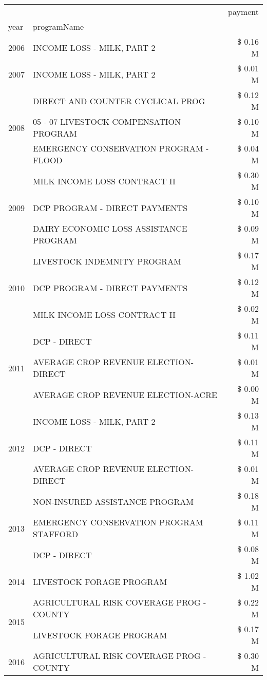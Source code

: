 \begin{tabular}{llr}
\toprule
 &  & payment \\
year & programName &  \\
\midrule
2006 & INCOME LOSS - MILK, PART 2 & \$ 0.16 M \\
\cline{1-3}
2007 & INCOME LOSS - MILK, PART 2 & \$ 0.01 M \\
\cline{1-3}
\multirow[t]{3}{*}{2008} & DIRECT AND COUNTER CYCLICAL PROG & \$ 0.12 M \\
 & 05 - 07 LIVESTOCK COMPENSATION PROGRAM & \$ 0.10 M \\
 & EMERGENCY CONSERVATION PROGRAM - FLOOD & \$ 0.04 M \\
\cline{1-3}
\multirow[t]{3}{*}{2009} & MILK INCOME LOSS CONTRACT II & \$ 0.30 M \\
 & DCP PROGRAM - DIRECT PAYMENTS & \$ 0.10 M \\
 & DAIRY ECONOMIC LOSS ASSISTANCE PROGRAM & \$ 0.09 M \\
\cline{1-3}
\multirow[t]{3}{*}{2010} & LIVESTOCK INDEMNITY PROGRAM & \$ 0.17 M \\
 & DCP PROGRAM - DIRECT PAYMENTS & \$ 0.12 M \\
 & MILK INCOME LOSS CONTRACT II & \$ 0.02 M \\
\cline{1-3}
\multirow[t]{3}{*}{2011} & DCP - DIRECT & \$ 0.11 M \\
 & AVERAGE CROP REVENUE ELECTION-DIRECT & \$ 0.01 M \\
 & AVERAGE CROP REVENUE ELECTION-ACRE & \$ 0.00 M \\
\cline{1-3}
\multirow[t]{3}{*}{2012} & INCOME LOSS - MILK, PART 2 & \$ 0.13 M \\
 & DCP - DIRECT & \$ 0.11 M \\
 & AVERAGE CROP REVENUE ELECTION-DIRECT & \$ 0.01 M \\
\cline{1-3}
\multirow[t]{3}{*}{2013} & NON-INSURED ASSISTANCE PROGRAM & \$ 0.18 M \\
 & EMERGENCY CONSERVATION PROGRAM STAFFORD & \$ 0.11 M \\
 & DCP - DIRECT & \$ 0.08 M \\
\cline{1-3}
2014 & LIVESTOCK FORAGE PROGRAM & \$ 1.02 M \\
\cline{1-3}
\multirow[t]{2}{*}{2015} & AGRICULTURAL RISK COVERAGE PROG - COUNTY & \$ 0.22 M \\
 & LIVESTOCK FORAGE PROGRAM & \$ 0.17 M \\
\cline{1-3}
\multirow[t]{3}{*}{2016} & AGRICULTURAL RISK COVERAGE PROG - COUNTY & \$ 0.30 M \\

\end{tabular}
